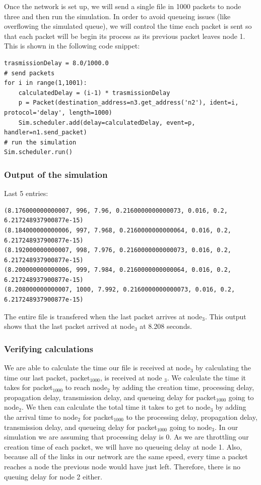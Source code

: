 \documentclass[fleqn,11pt]{article}
\begin{document}
Once the network is set up, we will send a single file in 1000 packets to node three and then run the simulation. In order to avoid queueing issues (like overflowing the simulated queue), we will control the time each packet is sent so that each packet will be begin its process as its previous packet leaves node 1. This is shown in the following code snippet:    

\begin{lstlisting}
trasmissionDelay = 8.0/1000.0    
# send packets
for i in range(1,1001):
    calculatedDelay = (i-1) * trasmissionDelay
    p = Packet(destination_address=n3.get_address('n2'), ident=i, protocol='delay', length=1000)
    Sim.scheduler.add(delay=calculatedDelay, event=p, handler=n1.send_packet)
# run the simulation
Sim.scheduler.run() 
\end{lstlisting}
\subsubsection{Output of the simulation}
Last 5 entries:
\begin{lstlisting}
(8.176000000000007, 996, 7.96, 0.2160000000000073, 0.016, 0.2, 6.217248937900877e-15)
(8.184000000000006, 997, 7.968, 0.2160000000000064, 0.016, 0.2, 6.217248937900877e-15)
(8.192000000000007, 998, 7.976, 0.2160000000000073, 0.016, 0.2, 6.217248937900877e-15)
(8.200000000000006, 999, 7.984, 0.2160000000000064, 0.016, 0.2, 6.217248937900877e-15)
(8.208000000000007, 1000, 7.992, 0.2160000000000073, 0.016, 0.2, 6.217248937900877e-15)
\end{lstlisting}
The entire file is transfered when the last packet arrives at node$_3$. This output shows that the last packet arrived at node$_3$ at 8.208 seconds.
\subsubsection{Verifying calculations}
We are able to calculate the time our file is received at node$_3$ by calculating the time our last packet, packet$_{1000}$, is received at node $_3$. We calculate the time it takes for packet$_{1000}$ to reach node$_2$ by adding the creation time, processing delay, propagation delay, transmission delay, and queueing delay for packet$_{1000}$ going to node$_2$. We then can calculate the total time it takes to get to node$_3$ by adding the arrival time to node$_2$ for packet$_{1000}$ to the processing delay, propagation delay, transmission delay, and queueing delay for packet$_{1000}$ going to node$_3$. In our simulation we are assuming that processing delay is 0. As we are throttling our creation time of each packet, we will have no queueing delay at node 1. Also, because all of the links in our network are the same speed, every time a packet reaches a node the previous node would have just left. Therefore, there is no queuing delay for node 2 either.
\end{document}
